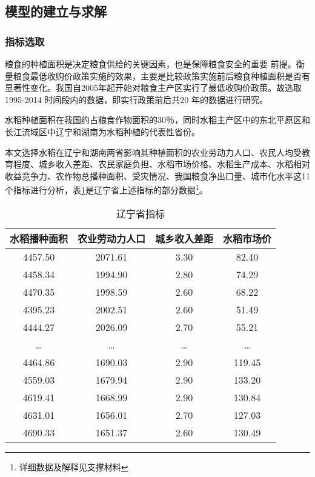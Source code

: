 \documentclass[withoutpreface,bwprint]{cumcmthesis} %
\begin{document}
		\subsection{模型的建立与求解}
		\subsubsection{指标选取}
粮食的种植面积是决定粮食供给的关键因素，也是保障粮食安全的重要
前提。衡量粮食最低收购价政策实施的效果，主要是比较政策实施前后粮食种植面积是否有显著性变化。我国自2005年起开始对粮食主产区实行了最低收购价政策。故选取1995-2014 时间段内的数据，即实行政策前后共20 年的数据进行研究。\par
水稻种植面积在我国约占粮食作物面积的30％，同时水稻主产区中的东北平原区和长江流域区中辽宁和湖南为水稻种植的代表性省份。\par
本文选择水稻在辽宁和湖南两省影响其种植面积的农业劳动力人口、农民人均受教育程度、城乡收入差距、农民家庭负担、水稻市场价格、水稻生产成本、水稻相对收益竞争力、农作物总播种面积、受灾情况、我国粮食净出口量、城市化水平这11个指标进行分析，表\ref{tab:ln}是辽宁省上述指标的部分数据\footnote{详细数据及解释见支撑材料}。
\begin{table}[htbp]
  	\caption{辽宁省指标}
  	\centering
  	\label{tab:ln}
	\begin{tabular}{cccc}
    \toprule[2pt]
    水稻播种面积 & 农业劳动力人口& 城乡收入差距 & 水稻市场价\\
    \midrule[1.5pt]
    4457.50 & 2071.61 & 3.30  & 82.40 \\
    4458.34 & 1994.90 & 2.80  & 74.29 \\
    4470.35 & 1998.59 & 2.60  & 68.22 \\
    4395.23 & 2002.51 & 2.60  & 51.49 \\
    4444.27 & 2026.09 & 2.70  & 55.21 \\
    \ldots  & \ldots  &\ldots &\ldots \\
    4464.86 & 1690.03 & 2.90  &119.45 \\
    4559.03 & 1679.94 & 2.90  &133.20 \\
    4619.41 & 1668.99 & 2.90  &130.84 \\
    4631.01 & 1656.01 & 2.70  &127.03 \\
    4690.33 & 1651.37 & 2.60  &130.49 \\
    \bottomrule[2pt]
    \end{tabular}%
\end{table}
\end{document}
